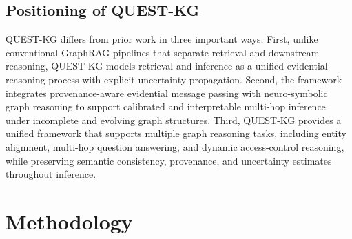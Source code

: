 \documentclass[sigconf,review,anonymous]{acmart}
\begin{document}
\subsection{Positioning of QUEST-KG}

QUEST-KG differs from prior work in three important ways. First, unlike conventional GraphRAG pipelines that separate retrieval and downstream reasoning, QUEST-KG models retrieval and inference as a unified evidential reasoning process with explicit uncertainty propagation. Second, the framework integrates provenance-aware evidential message passing with neuro-symbolic graph reasoning to support calibrated and interpretable multi-hop inference under incomplete and evolving graph structures. Third, QUEST-KG provides a unified framework that supports multiple graph reasoning tasks, including entity alignment, multi-hop question answering, and dynamic access-control reasoning, while preserving semantic consistency, provenance, and uncertainty estimates throughout inference.

\section{Methodology}
\end{document}
